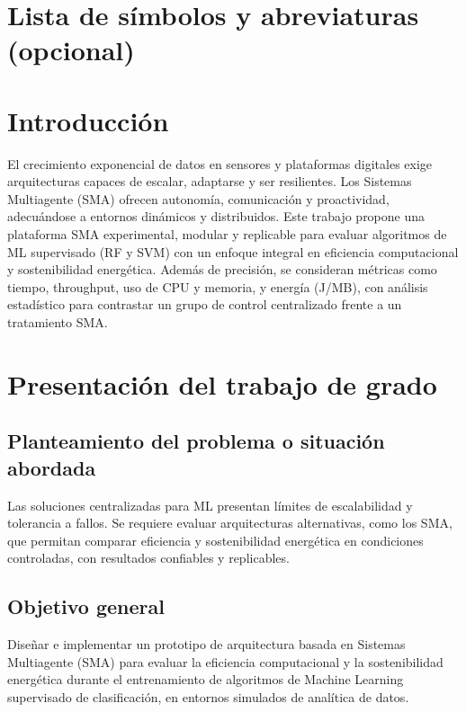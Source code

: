 \documentclass[12pt,twoside]{report}
\begin{document}
\chapter*{Lista de símbolos y abreviaturas (opcional)}
\clearpage

\chapter*{Introducción}
El crecimiento exponencial de datos en sensores y plataformas digitales exige arquitecturas capaces de escalar, adaptarse y ser resilientes. Los Sistemas Multiagente (SMA) ofrecen autonomía, comunicación y proactividad, adecuándose a entornos dinámicos y distribuidos. Este trabajo propone una plataforma SMA experimental, modular y replicable para evaluar algoritmos de ML supervisado (RF y SVM) con un enfoque integral en eficiencia computacional y sostenibilidad energética. Además de precisión, se consideran métricas como tiempo, throughput, uso de CPU y memoria, y energía (J/MB), con análisis estadístico para contrastar un grupo de control centralizado frente a un tratamiento SMA.
\clearpage

\chapter{Presentación del trabajo de grado}
\section{Planteamiento del problema o situación abordada}
Las soluciones centralizadas para ML presentan límites de escalabilidad y tolerancia a fallos. Se requiere evaluar arquitecturas alternativas, como los SMA, que permitan comparar eficiencia y sostenibilidad energética en condiciones controladas, con resultados confiables y replicables.

\section{Objetivo general}
Diseñar e implementar un prototipo de arquitectura basada en Sistemas Multiagente (SMA) para evaluar la eficiencia computacional y la sostenibilidad energética durante el entrenamiento de algoritmos de Machine Learning supervisado de clasificación, en entornos simulados de analítica de datos.
\end{document}
